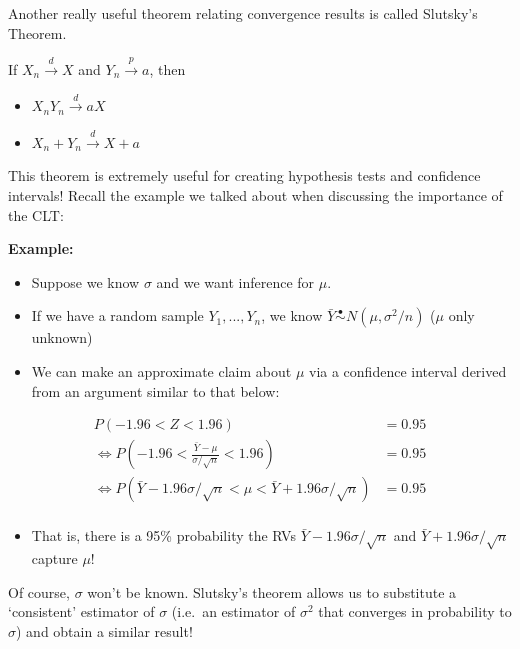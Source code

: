 \documentclass[
]{article}
\providecommand{\tightlist}{%
  \setlength{\itemsep}{0pt}\setlength{\parskip}{0pt}}
\begin{document}
Another really useful theorem relating convergence results is called
Slutsky's Theorem.

\begin{description}
\tightlist
\item[Slutsky's Theorem]
If \(X_n\stackrel{d}\rightarrow X\) and
\(Y_n\stackrel{p}\rightarrow a\), then
\end{description}

\begin{itemize}
\tightlist
\item
  \(X_nY_n\stackrel{d}\rightarrow aX\)
\item
  \(X_n+Y_n\stackrel{d}\rightarrow X+a\)
\end{itemize}

This theorem is extremely useful for creating hypothesis tests and
confidence intervals! Recall the example we talked about when discussing
the importance of the CLT:

\textbf{Example:}

\begin{itemize}
\tightlist
\item
  Suppose we know \(\sigma\) and we want inference for \(\mu\).
\item
  If we have a random sample \(Y_1,...,Y_n\), we know
  \(\bar{Y}\stackrel{\bullet}{\sim}N(\mu,\sigma^2/n)\) (\(\mu\) only
  unknown)
\item
  We can make an approximate claim about \(\mu\) via a confidence
  interval derived from an argument similar to that below:
\end{itemize}

\begin{align*}
P(-1.96<Z<1.96) &= 0.95\\
\Leftrightarrow P\left(-1.96<\frac{\bar{Y}-\mu}{\sigma/\sqrt{n}}<1.96\right) &= 0.95\\
\Leftrightarrow P\left(\bar{Y}-1.96\sigma/\sqrt{n}<\mu<\bar{Y}+1.96\sigma/\sqrt{n}\right) &= 0.95\\
\end{align*}

\begin{itemize}
\tightlist
\item
  That is, there is a 95\% probability the RVs
  \(\bar{Y}-1.96\sigma/\sqrt{n}\) and \(\bar{Y}+1.96\sigma/\sqrt{n}\)
  capture \(\mu\)!
\end{itemize}

Of course, \(\sigma\) won't be known. Slutsky's theorem allows us to
substitute a `consistent' estimator of \(\sigma\) (i.e.~an estimator of
\(\sigma^2\) that converges in probability to \(\sigma\)) and obtain a
similar result!
\end{document}
